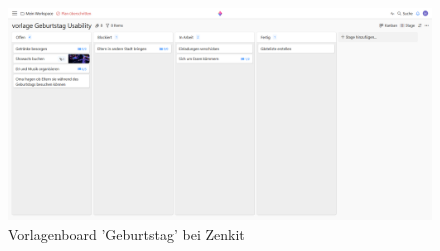 \begin{figure}[H]
    \includegraphics[width=\textwidth]{images/UI/geburtstagzenkit.PNG}
    \centering
    \caption{Vorlagenboard 'Geburtstag' bei Zenkit}
    \label{fig:zenkitgebu}
\end{figure}
